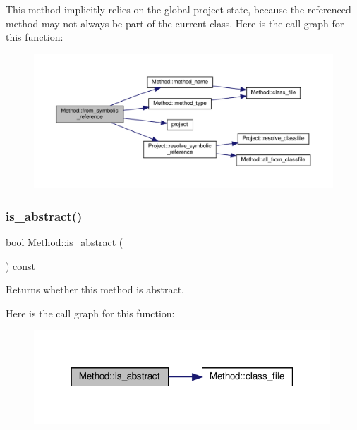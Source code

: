 This method implicitly relies on the global project state, because the referenced method may not always be part of the current class. Here is the call graph for this function\+:\nopagebreak
\begin{figure}[H]
\begin{center}
\leavevmode
\includegraphics[width=350pt]{classMethod_adddc54ce699dfb1ba305595507085a29_cgraph}
\end{center}
\end{figure}
\mbox{\label{classMethod_a6dfb75c6faf8961c6e04a86eca6e97e8}} 
\subsubsection{\texorpdfstring{is\+\_\+abstract()}{is\_abstract()}}
{\footnotesize\ttfamily bool Method\+::is\+\_\+abstract (\begin{DoxyParamCaption}{ }\end{DoxyParamCaption}) const}



Returns whether this method is abstract. 

Here is the call graph for this function\+:\nopagebreak
\begin{figure}[H]
\begin{center}
\leavevmode
\includegraphics[width=315pt]{classMethod_a6dfb75c6faf8961c6e04a86eca6e97e8_cgraph}
\end{center}
\end{figure}
\mbox{\label{classMethod_a74801df628f1be6e2c616cf5feb328b1}} 
